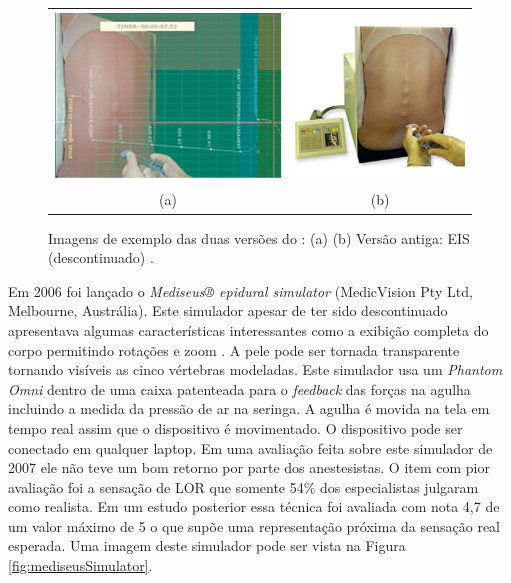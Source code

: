 \begin{figure}[ht!]
    \centering
        \begin{tabular}{cc}
        \includegraphics[width=0.4\linewidth]{capitulos/figuras/epiduralInjectionSimulatorPM.jpg} & 
        \includegraphics[width=0.3\linewidth]{capitulos/figuras/epiduralInjectionSimulator.jpg} 
        \\
        (a) & (b)
        \end{tabular}
    \caption{Imagens de exemplo das duas versões do : (a)  (b) Versão antiga: EIS (descontinuado)  \cite{CPRSavers&FirstAidSupply2018}.}
    \label{fig:EpiduralInjectionSimulator}
\end{figure}

Em 2006 foi lançado o \textit{Mediseus® epidural simulator} (MedicVision Pty Ltd, Melbourne, Austrália). Este simulador apesar de ter sido descontinuado apresentava algumas características interessantes como a exibição completa do corpo permitindo rotações e zoom \cite{Mayooran2006}. A pele pode ser tornada transparente tornando visíveis as cinco vértebras modeladas. Este simulador usa um \textit{Phantom Omni} dentro de uma caixa patenteada \cite{Brien2007} para o \textit{feedback} das forças na agulha incluindo a medida da pressão de ar na seringa. A agulha é movida na tela em tempo real assim que o dispositivo é movimentado. O dispositivo pode ser conectado em qualquer laptop. Em uma avaliação feita sobre este simulador de 2007 \cite{Elks2007} ele não teve um bom retorno por parte dos anestesistas. O item com pior avaliação foi a sensação de LOR que somente 54\% dos especialistas julgaram como realista. Em um estudo posterior \cite{Lee2012} essa técnica foi avaliada com nota 4,7 de um valor máximo de 5 o que supõe uma representação próxima da sensação real esperada. Uma imagem deste simulador pode ser vista na Figura \ref{fig:mediseusSimulator}.

